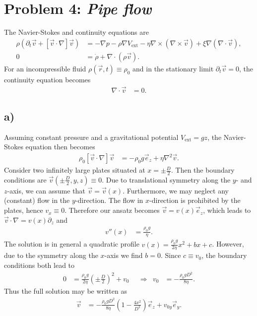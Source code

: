 \documentclass[english, parskip=full]{scrartcl}
\newcommand{\kla}{}
\newcommand{\tecxt}{}
\begin{document}
\newpage
\section*{Problem 4: \normalfont\textit{\large{Pipe flow}}}
The Navier-Stokes and continuity equations are
\begin{align}
\rho\kla\left( {\partial_t\vec{v} + [\vec{v}\cdot\nabla]\vec{v}} \right) &= -\nabla p - \rho\nabla V_\tecxt\text{ext} - \eta\nabla\times \kla\left( {\nabla\times\vec{v}} \right) + \xi \nabla (\nabla\cdot \vec{v}),\\
0 &= \dot{\rho} + \nabla\cdot\kla\left( {\rho\vec{v}} \right).
\end{align}
For an incompressible fluid $\rho(\vec{r},t) \equiv \rho_0$ and in the stationary limit $\partial_t\vec{v} = 0$, the continuity equation becomes
\begin{align}
\nabla\cdot\vec{v} &= 0.
\end{align}

\subsection*{a)}
Assuming constant pressure and a gravitational potential $V_\tecxt\text{ext} = gz$, the Navier-Stokes equation then becomes
\begin{align}
\rho_0 [\vec{v}\cdot\nabla]\vec{v} &= -\rho_0g\vec{e}_z + \eta \nabla^2\vec{v}.
\end{align}
Consider two infinitely large plates situated at $x=\pm\frac{D}{2}$.
Then the boundary conditions are $\vec{v}\kla\left( {\pm\frac{D}{2},y,z} \right) \equiv 0$.
Due to translational symmetry along the $y$- and $z$-axis, we can assume that $\vec{v} = \vec{v}(x)$.
Furthermore, we may neglect any (constant) flow in the $y$-direction.
The flow in $x$-direction is prohibited by the plates, hence $v_x \equiv 0$. 
Therefore our ansatz becomes $\vec{v} = v(x)\vec{e}_z$, which leads to $\vec{v}\cdot\nabla = v(x)\partial_z$ and
\begin{align}
v''(x) &= \frac{\rho_0g}{\eta}.
\end{align}
The solution is in general a quadratic profile $v(x) = \frac{\rho_0g}{2\eta}x^2 + bx + c$.
However, due to the symmetry along the $x$-axis we find $b=0$.
Since $c\equiv v_0$, the boundary conditions both lead to
\begin{align}
0 &= \frac{\rho_0g}{2\eta} \kla\left( {\pm\frac{D}{2}} \right)^2  + v_0 &&\Rightarrow & v_0 &= -\frac{\rho_0gD^2}{8\eta}.
\end{align}
Thus the full solution may be written as
\begin{align}
\vec{v} &= -\frac{\rho_0gD^2}{8\eta} \kla\left( {1 - \frac{4x^2}{D^2}} \right) \vec{e}_z + v_{0y}\vec{e}_y.
\end{align}
\end{document}

